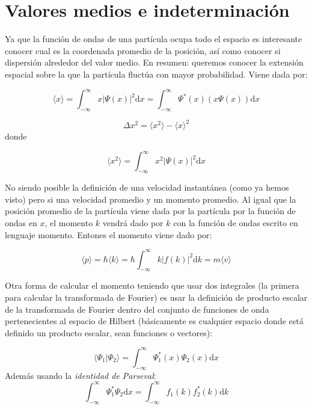 \documentclass[12pt]{article}
\newcommand{\D}{\mathrm{d}}
\newcommand{\intf}{\int_{-\infty}^{\infty}}
\begin{document}
\section{Valores medios e indeterminación}

Ya que la función de ondas de una partícula ocupa todo el espacio es interesante conocer cual es la coordenada promedio de la posición, así como conocer si dispersión alrededor del valor medio. En resumen: queremos conocer la extensión espacial sobre la que la partícula fluctúa con mayor probabilidad. Viene dada por:

\begin{equation}
\langle x \rangle = \intf x |\Psi (x) |^2 \D x = \intf \Psi ^* (x) (x \Psi (x)) \D x
\end{equation}

\begin{equation}
\Delta x^2 = \langle x^2 \rangle - \langle x \rangle^2
\end{equation}
donde 

\begin{equation}
\langle x^2 \rangle = \intf x^2 |\Psi (x)|^2  \D x
\end{equation}

No siendo posible la definición de una velocidad instantánea (como ya hemos visto) pero si una velocidad promedio y un momento promedio. Al igual que la posición promedio de la partícula viene dada por la partícula por la función de ondas en $x$, el momento $k$ vendrá dado por $k$ con la función de ondas escrito en lenguaje momento. Entones el momento viene dado por:

\begin{equation}
\langle p \rangle = \hbar \langle k \rangle = \hbar \intf k |f(k)|^2 \D k = m \langle v \rangle
\end{equation}

Otra forma de calcular el momento teniendo que usar dos integrales (la primera para calcular la transformada de Fourier) es usar la definición de producto escalar de la transformada de Fourier dentro del conjunto de funciones de onda pertenecientes al espacio de Hilbert (básicamente es cualquier espacio donde está definido un producto escalar, sean funciones o vectores):

\begin{equation}
\langle \Psi_1 | \Psi_2 \rangle = \intf \Psi_1^* (x) \Psi_2 (x) \D x
\end{equation}
Además usando la \textit{identidad de Parseval}:
\begin{equation}
\intf  \Psi_1^* \Psi_2 \D x = \intf f_1(k) f_2^* (k) \D k
\end{equation}
\end{document}
